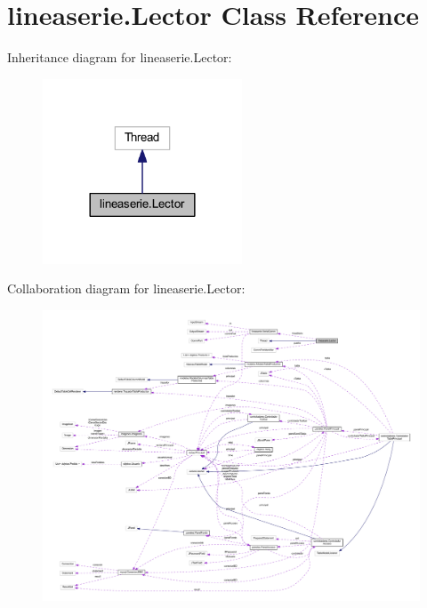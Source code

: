 \hypertarget{classlineaserie_1_1_lector}{}\section{lineaserie.\+Lector Class Reference}
\label{classlineaserie_1_1_lector}


Inheritance diagram for lineaserie.\+Lector\+:
\nopagebreak
\begin{figure}[H]
\begin{center}
\leavevmode
\includegraphics[width=168pt]{classlineaserie_1_1_lector__inherit__graph}
\end{center}
\end{figure}


Collaboration diagram for lineaserie.\+Lector\+:
\nopagebreak
\begin{figure}[H]
\begin{center}
\leavevmode
\includegraphics[width=350pt]{classlineaserie_1_1_lector__coll__graph}
\end{center}
\end{figure}
